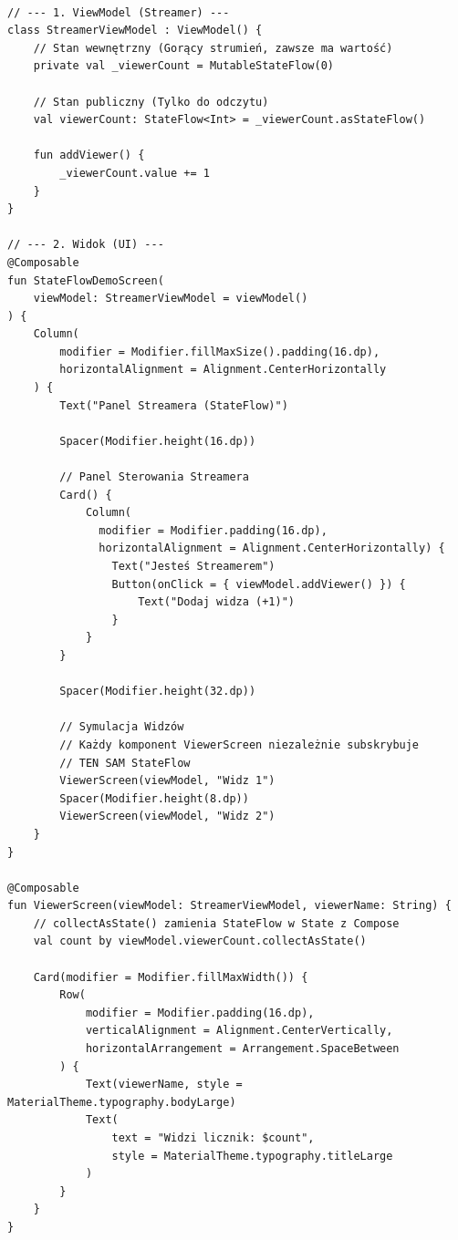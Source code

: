 \begin{verbatim}

// --- 1. ViewModel (Streamer) ---
class StreamerViewModel : ViewModel() {
    // Stan wewnętrzny (Gorący strumień, zawsze ma wartość)
    private val _viewerCount = MutableStateFlow(0)
    
    // Stan publiczny (Tylko do odczytu)
    val viewerCount: StateFlow<Int> = _viewerCount.asStateFlow()

    fun addViewer() {
        _viewerCount.value += 1
    }
}

// --- 2. Widok (UI) ---
@Composable
fun StateFlowDemoScreen(
    viewModel: StreamerViewModel = viewModel()
) {
    Column(
        modifier = Modifier.fillMaxSize().padding(16.dp),
        horizontalAlignment = Alignment.CenterHorizontally
    ) {
        Text("Panel Streamera (StateFlow)")
        
        Spacer(Modifier.height(16.dp))
        
        // Panel Sterowania Streamera
        Card() {
            Column(
              modifier = Modifier.padding(16.dp), 
              horizontalAlignment = Alignment.CenterHorizontally) {
                Text("Jesteś Streamerem")
                Button(onClick = { viewModel.addViewer() }) {
                    Text("Dodaj widza (+1)")
                }
            }
        }

        Spacer(Modifier.height(32.dp))

        // Symulacja Widzów
        // Każdy komponent ViewerScreen niezależnie subskrybuje 
        // TEN SAM StateFlow
        ViewerScreen(viewModel, "Widz 1")
        Spacer(Modifier.height(8.dp))
        ViewerScreen(viewModel, "Widz 2")
    }
}

@Composable
fun ViewerScreen(viewModel: StreamerViewModel, viewerName: String) {
    // collectAsState() zamienia StateFlow w State z Compose
    val count by viewModel.viewerCount.collectAsState()
    
    Card(modifier = Modifier.fillMaxWidth()) {
        Row(
            modifier = Modifier.padding(16.dp),
            verticalAlignment = Alignment.CenterVertically,
            horizontalArrangement = Arrangement.SpaceBetween
        ) {
            Text(viewerName, style = MaterialTheme.typography.bodyLarge)
            Text(
                text = "Widzi licznik: $count", 
                style = MaterialTheme.typography.titleLarge
            )
        }
    }
}
\end{verbatim}


